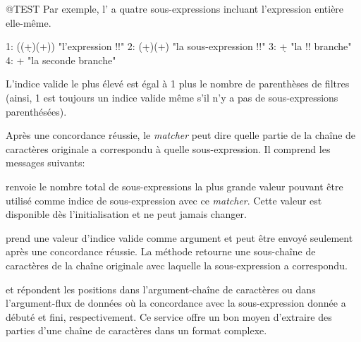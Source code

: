 \documentclass[a4paper,10pt,twoside]{book}
\begin{document}
\begin{code}{@TEST}
Par exemple, l'\expreg \ct{((\d+)\s*(\w+))} a quatre sous-expressions
incluant l'expression entière elle-même.
\begin{code}{}
1:    ((\d+)\s*(\w+))    "l'expression !!"
2:    (\d+)\s*(\w+)       "la sous-expression !!"
3:    \d+                      "la !! branche"
4:    \w+                     "la seconde branche"
\end{code}

L'indice valide le plus élevé est égal à 1 plus le nombre de
parenthèses de filtres (ainsi, 1 est toujours un indice valide même
s'il n'y a pas de sous-expressions parenthésées).

Après une concordance réussie, le \emph{matcher} peut dire quelle
partie de la chaîne de caractères originale a correspondu à quelle
sous-expression. Il comprend les messages suivants:

 renvoie le nombre total de
sous-expressions \ie la plus grande valeur pouvant être utilisé comme
indice de sous-expression avec ce \emph{matcher}. Cette valeur est
disponible dès l'initialisation et ne peut jamais changer.

 prend une valeur d'indice valide
comme argument et peut être envoyé seulement après une concordance
réussie. La méthode retourne une sous-chaîne de caractères de la
chaîne originale avec laquelle la sous-expression a correspondu.

 et 
répondent les positions dans l'argument-chaîne de caractères ou dans
l'argument-flux de données où la concordance avec la sous-expression
donnée a débuté et fini, respectivement.
Ce service offre un bon moyen d'extraire des parties d'une chaîne de
caractères dans un format complexe.


\end{code}
\end{document}
